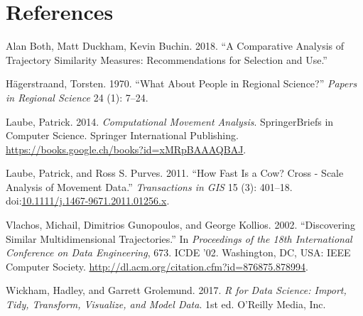 \documentclass[]{book}
\begin{document}
\chapter*{References}\label{references}

\hypertarget{refs}{}
\hypertarget{ref-both2018}{}
Alan Both, Matt Duckham, Kevin Buchin. 2018. ``A Comparative Analysis of
Trajectory Similarity Measures: Recommendations for Selection and Use.''

\hypertarget{ref-hagerstraand1970}{}
Hägerstraand, Torsten. 1970. ``What About People in Regional Science?''
\emph{Papers in Regional Science} 24 (1): 7--24.

\hypertarget{ref-laube2014}{}
Laube, Patrick. 2014. \emph{Computational Movement Analysis}.
SpringerBriefs in Computer Science. Springer International Publishing.
\url{https://books.google.ch/books?id=xMRpBAAAQBAJ}.

\hypertarget{ref-laube2011}{}
Laube, Patrick, and Ross S. Purves. 2011. ``How Fast Is a Cow? Cross -
Scale Analysis of Movement Data.'' \emph{Transactions in GIS} 15 (3):
401--18.
doi:\href{https://doi.org/10.1111/j.1467-9671.2011.01256.x}{10.1111/j.1467-9671.2011.01256.x}.

\hypertarget{ref-vlachos2002}{}
Vlachos, Michail, Dimitrios Gunopoulos, and George Kollios. 2002.
``Discovering Similar Multidimensional Trajectories.'' In
\emph{Proceedings of the 18th International Conference on Data
Engineering}, 673. ICDE '02. Washington, DC, USA: IEEE Computer Society.
\url{http://dl.acm.org/citation.cfm?id=876875.878994}.

\hypertarget{ref-wickham2017}{}
Wickham, Hadley, and Garrett Grolemund. 2017. \emph{R for Data Science:
Import, Tidy, Transform, Visualize, and Model Data}. 1st ed. O'Reilly
Media, Inc.
\end{document}
